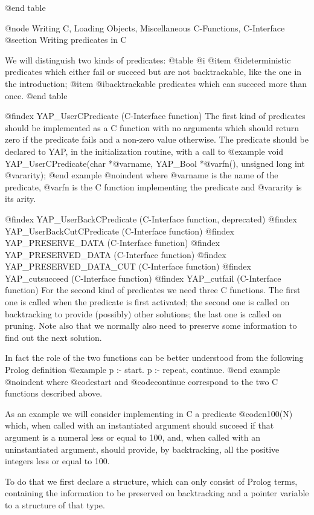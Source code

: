 {{{{{{{{{@end table


@node Writing C, Loading Objects, Miscellaneous C-Functions, C-Interface
@section Writing predicates in C

We will distinguish two kinds of predicates:
@table @i
@item @i{deterministic} predicates which either fail or succeed but are not
backtrackable, like the one in the introduction;
@item @i{backtrackable}
predicates which can succeed more than once.
@end table

@findex YAP_UserCPredicate (C-Interface function)
The first kind of predicates should be implemented as a C function with
no arguments which should return zero if the predicate fails and a
non-zero value otherwise. The predicate should be declared to
YAP, in the initialization routine, with a call to
@example
      void YAP_UserCPredicate(char *@var{name}, YAP_Bool *@var{fn}(), unsigned long int @var{arity});
@end example
@noindent
where @var{name} is the name of the predicate, @var{fn} is the C function
implementing the predicate and @var{arity} is its arity.

@findex YAP_UserBackCPredicate (C-Interface function, deprecated)
@findex YAP_UserBackCutCPredicate (C-Interface function)
@findex YAP_PRESERVE_DATA (C-Interface function)
@findex YAP_PRESERVED_DATA (C-Interface function)
@findex YAP_PRESERVED_DATA_CUT (C-Interface function)
@findex YAP_cutsucceed (C-Interface function)
@findex YAP_cutfail (C-Interface function)
For the second kind of predicates we need three C functions. The first one
 is called when the predicate is first activated; the second one
is called on backtracking to provide (possibly) other solutions; the
 last one is called on pruning. Note
also that we normally also need to preserve some information to find out
the next solution.

In fact the role of the two functions can be better understood from the
following Prolog definition
@example
       p :- start.
       p :- repeat,
                continue.
@end example
@noindent
where @code{start} and @code{continue} correspond to the two C functions
described above.


As an example we will consider implementing in C a predicate @code{n100(N)}
which, when called with an instantiated argument should succeed if that
argument is a numeral less or equal to 100, and, when called with an
uninstantiated argument, should provide, by backtracking, all the positive
integers less or equal to 100.

   To do that we first declare a structure, which can only consist
of Prolog terms, containing the information to be preserved on backtracking
and a pointer variable to a structure of that type.

}}}}}}}}}
